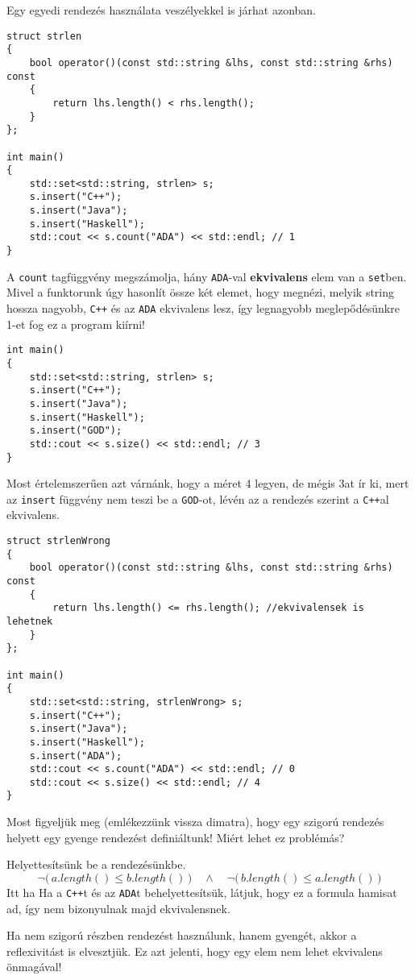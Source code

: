 \documentclass[a4paper,11.5pt]{article}
\begin{document}
	Egy egyedi rendezés használata veszélyekkel is járhat azonban.
	\begin{lstlisting}
struct strlen
{
	bool operator()(const std::string &lhs, const std::string &rhs) const
	{
		return lhs.length() < rhs.length();
	}
};

int main()
{
	std::set<std::string, strlen> s;
	s.insert("C++");
	s.insert("Java");
	s.insert("Haskell");
	std::cout << s.count("ADA") << std::endl; // 1
}
	\end{lstlisting}
	A \texttt{count} tagfüggvény megszámolja, hány \texttt{ADA}-val \textbf{ekvivalens} elem van a \texttt{set}ben. Mivel a funktorunk úgy hasonlít össze két elemet, hogy megnézi, melyik string hossza nagyobb, \texttt{C++} és az \texttt{ADA} ekvivalens lesz, így legnagyobb meglepődésünkre 1-et fog ez a program kiírni!
\begin{lstlisting}
int main()
{
	std::set<std::string, strlen> s;
	s.insert("C++");
	s.insert("Java");
	s.insert("Haskell");
	s.insert("GOD");
	std::cout << s.size() << std::endl; // 3
}
\end{lstlisting}
	Most értelemszerűen azt várnánk, hogy a méret 4 legyen, de mégis 3at ír ki, mert az \texttt{insert} függvény nem teszi be a \texttt{GOD}-ot, lévén az a rendezés szerint a \texttt{C++}al ekvivalens.
\begin{lstlisting}
struct strlenWrong
{
	bool operator()(const std::string &lhs, const std::string &rhs) const
	{
		return lhs.length() <= rhs.length(); //ekvivalensek is lehetnek
	}
};

int main()
{
	std::set<std::string, strlenWrong> s;
	s.insert("C++");
	s.insert("Java");
	s.insert("Haskell");
	s.insert("ADA");
	std::cout << s.count("ADA") << std::endl; // 0
	std::cout << s.size() << std::endl; // 4
}
\end{lstlisting}
	Most figyeljük meg (emlékezzünk vissza dimatra), hogy egy szigorú rendezés helyett egy gyenge rendezést definiáltunk! Miért lehet ez problémás?
	
	\smallskip
	Helyettesítsünk be a rendezésünkbe.
	\[ \neg\big(\,a.length() \leq b.length()\,\big)\quad \wedge \quad \neg\big(\,b.length() \leq a.length()\,\big) \]
	Itt ha Ha a \texttt{C++}t és az \texttt{ADA}t behelyettesítsük, látjuk, hogy ez a formula hamisat ad, így nem bizonyulnak majd ekvivalensnek.
	
	Ha nem szigorú részben rendezést használunk, hanem gyengét, akkor a reflexivitást is elvesztjük. Ez azt jelenti, hogy egy elem nem lehet ekvivalens önmagával!
	
\end{document}
